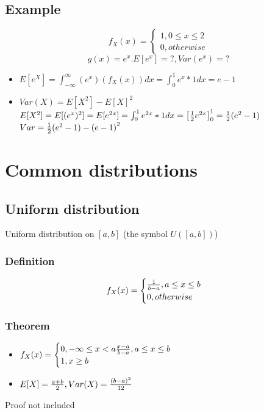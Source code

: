 \documentclass{article}
\newcommand{\intf}{\int^{\infty}_{-\infty}}
\newcommand{\intb}{\int^{1}_{0}}
\begin{document}
\subsection{Example}
$$ f_X(x) =
  \begin{cases}
    1, 0\le x\le 2\\
    0, otherwise
  \end{cases}
$$
$$ g(x) = e^x. E[e^x] = ?, Var(e^x) = ? $$
\begin{itemize}
  \item $ E[e^X] = \intf (e^x)(f_X(x))dx = \int^1_0 e^x * 1 dx = e - 1 $
  \item $ Var(X) = E[X^2] - E[X]^2 $\\
    $ E[X^2] = E[(e^x)^2] = E[e^{2x}] = \intb e^{2x} * 1 dx  = {\left[ \f 12 e^{2x}\right]}^1_0 = \f 12(e^2-1)$\\
    $ Var = \frac{1}{2} (e^2-1) - {(e-1)}^2 $
\end{itemize}

\section{Common distributions}
\subsection{Uniform distribution}
Uniform distribution on $[a,b]$ (the symbol $U([a,b])$)
\subsubsection{Definition}
$$ f_X(x) =
  \begin{cases}
    \frac{1}{b-a}, a\le x\le b\\
    0, otherwise
  \end{cases}
$$

\subsubsection{Theorem}
\begin{itemize}
  \item  $ f_X(x) =
  \begin{cases}
    0, -\infty \le x < a
    \frac{x-a}{b-a}, a\le x\le b\\
    1, x\ge b
  \end{cases}$
 \item $ E[X] = \frac{a+b}{2}, Var(X) = \frac{{(b-a)}^2}{12} $
\end{itemize}

{\color{red} Proof not included}
\end{document}
